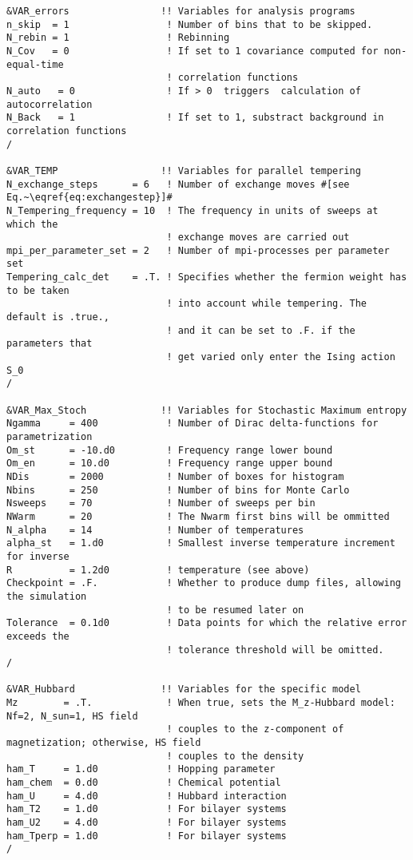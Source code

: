 \begin{lstlisting}[style=fortran,escapechar=\#,breaklines=true]
&VAR_errors                !! Variables for analysis programs
n_skip  = 1                 ! Number of bins that to be skipped.
N_rebin = 1                 ! Rebinning  
N_Cov   = 0                 ! If set to 1 covariance computed for non-equal-time
                            ! correlation functions
N_auto   = 0                ! If > 0  triggers  calculation of autocorrelation 
N_Back   = 1                ! If set to 1, substract background in correlation functions
/  

&VAR_TEMP                  !! Variables for parallel tempering
N_exchange_steps      = 6   ! Number of exchange moves #[see Eq.~\eqref{eq:exchangestep}]#
N_Tempering_frequency = 10  ! The frequency in units of sweeps at which the
                            ! exchange moves are carried out
mpi_per_parameter_set = 2   ! Number of mpi-processes per parameter set
Tempering_calc_det    = .T. ! Specifies whether the fermion weight has to be taken
                            ! into account while tempering. The default is .true.,
                            ! and it can be set to .F. if the parameters that
                            ! get varied only enter the Ising action S_0
/

&VAR_Max_Stoch             !! Variables for Stochastic Maximum entropy
Ngamma     = 400            ! Number of Dirac delta-functions for parametrization
Om_st      = -10.d0         ! Frequency range lower bound
Om_en      = 10.d0          ! Frequency range upper bound
NDis       = 2000           ! Number of boxes for histogram
Nbins      = 250            ! Number of bins for Monte Carlo
Nsweeps    = 70             ! Number of sweeps per bin
NWarm      = 20             ! The Nwarm first bins will be ommitted
N_alpha    = 14             ! Number of temperatures
alpha_st   = 1.d0           ! Smallest inverse temperature increment for inverse
R          = 1.2d0          ! temperature (see above) 
Checkpoint = .F.            ! Whether to produce dump files, allowing the simulation
                            ! to be resumed later on
Tolerance  = 0.1d0          ! Data points for which the relative error exceeds the
                            ! tolerance threshold will be omitted.
/

&VAR_Hubbard               !! Variables for the specific model
Mz        = .T.             ! When true, sets the M_z-Hubbard model: Nf=2, N_sun=1, HS field
                            ! couples to the z-component of magnetization; otherwise, HS field
                            ! couples to the density
ham_T     = 1.d0            ! Hopping parameter
ham_chem  = 0.d0            ! Chemical potential
ham_U     = 4.d0            ! Hubbard interaction
ham_T2    = 1.d0            ! For bilayer systems
ham_U2    = 4.d0            ! For bilayer systems
ham_Tperp = 1.d0            ! For bilayer systems
/
               
\end{lstlisting}
